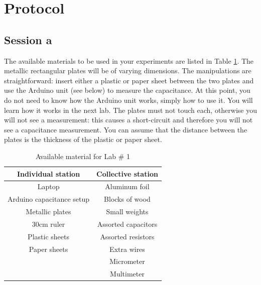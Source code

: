 \documentclass[12pt]{report}
\begin{document}
\section{Protocol}
\subsection{Session a}
The available materials to be used in your experiments are listed in Table \ref{Tab:Lab1-material}. The metallic rectangular plates will be of varying dimensions. The manipulations are straightforward: insert either a plastic or paper sheet between the two plates and use the Arduino unit (see below) to measure the capacitance. At this point, you do not need to know how the Arduino unit works, simply how to use it. You will learn how it works in the next lab. The plates must not touch each, otherwise you will not see a measurement: this causes a short-circuit and therefore you will not see a capacitance measurement. You can assume that the distance between the plates is the thickness of the plastic or paper sheet.
\begin{table}[h]
\centering
\begin{tabular}{||c | c ||}
\hline
Individual station & Collective station\\ \hline
Laptop & Aluminum foil \\
Arduino capacitance setup & Blocks of wood \\
Metallic plates & Small weights \\
30cm ruler & Assorted capacitors \\
Plastic sheets & Assorted resistors \\
Paper sheets & Extra wires \\
& Micrometer \\
& Multimeter \\
\hline
\end{tabular}
\caption{Available material for Lab \# 1}
\label{Tab:Lab1-material}
\end{table}
\end{document}
